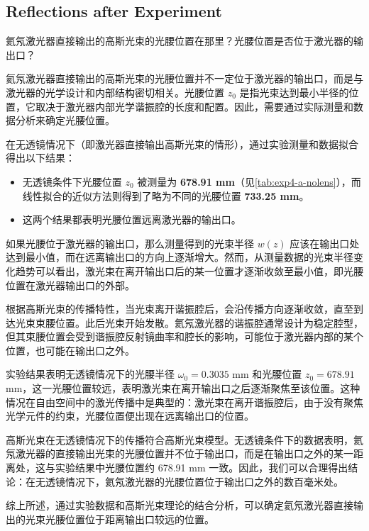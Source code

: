 \subsection{Reflections after Experiment}

\begin{question}
	氦氖激光器直接输出的高斯光束的光腰位置在那里？光腰位置是否位于激光器的输出口？
\end{question}
氦氖激光器直接输出的高斯光束的光腰位置并不一定位于激光器的输出口，而是与激光器的光学设计和内部结构密切相关。光腰位置 \(z_0\) 是指光束达到最小半径的位置，它取决于激光器内部光学谐振腔的长度和配置。因此，需要通过实际测量和数据分析来确定光腰位置。

在无透镜情况下（即激光器直接输出高斯光束的情形），通过实验测量和数据拟合得出以下结果：
\begin{itemize}
	\item 无透镜条件下光腰位置 \( z_0 \) 被测量为 \textbf{678.91 mm}（见\cref{tab:exp4-a-nolens}），而线性拟合的近似方法则得到了略为不同的光腰位置 \textbf{733.25 mm}。
	\item 这两个结果都表明光腰位置远离激光器的输出口。
\end{itemize}

如果光腰位于激光器的输出口，那么测量得到的光束半径 \( w(z) \) 应该在输出口处达到最小值，而在远离输出口的方向上逐渐增大。然而，从测量数据的光束半径变化趋势可以看出，激光束在离开输出口后的某一位置才逐渐收敛至最小值，即光腰位置在激光器输出口的外部。

根据高斯光束的传播特性，当光束离开谐振腔后，会沿传播方向逐渐收敛，直至到达光束束腰位置。此后光束开始发散。氦氖激光器的谐振腔通常设计为稳定腔型，但其束腰位置会受到谐振腔反射镜曲率和腔长的影响，可能位于激光器内部的某个位置，也可能在输出口之外。

实验结果表明无透镜情况下的光腰半径 \( \omega_0 = 0.3035 \) mm 和光腰位置 \( z_0 = 678.91 \) mm，这一光腰位置较远，表明激光束在离开输出口之后逐渐聚焦至该位置。这种情况在自由空间中的激光传播中是典型的：激光束在离开谐振腔后，由于没有聚焦光学元件的约束，光腰位置便出现在远离输出口的位置。

高斯光束在无透镜情况下的传播符合高斯光束模型。无透镜条件下的数据表明，氦氖激光器的直接输出光束的光腰位置并不位于输出口，而是在输出口之外的某一距离处，这与实验结果中光腰位置约 678.91 mm 一致。因此，我们可以合理得出结论：在无透镜情况下，氦氖激光器的光腰位置位于输出口之外的数百毫米处。

综上所述，通过实验数据和高斯光束理论的结合分析，可以确定氦氖激光器直接输出的光束光腰位置位于距离输出口较远的位置。


